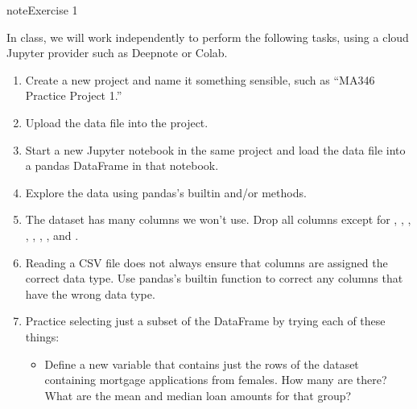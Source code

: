 \documentclass[letterpaper,10pt,english]{jupyterBook}
\begin{document}
\begin{sphinxadmonition}{note}{Exercise 1}

\sphinxAtStartPar
In class, we will work independently to perform the following tasks, using a cloud Jupyter provider such as Deepnote or Colab.
\begin{enumerate}
%
\item {} 
\sphinxAtStartPar
Create a new project and name it something sensible, such as “MA346 Practice Project 1.”

\item {} 
\sphinxAtStartPar
Upload the data file into the project.

\item {} 
\sphinxAtStartPar
Start a new Jupyter notebook in the same project and load the data file into a pandas DataFrame in that notebook.

\item {} 
\sphinxAtStartPar
Explore the data using pandas’s built\sphinxhyphen{}in  and/or  methods.

\item {} 
\sphinxAtStartPar
The dataset has many columns we won’t use.  Drop all columns except for , , , , , , , and .

\item {} 
\sphinxAtStartPar
Reading a CSV file does not always ensure that columns are assigned the correct data type.  Use pandas’s built\sphinxhyphen{}in  function to correct any columns that have the wrong data type.

\item {} 
\sphinxAtStartPar
Practice selecting just a subset of the DataFrame by trying each of these things:
\begin{itemize}
\item {} 
\sphinxAtStartPar
Define a new variable  that contains just the rows of the dataset containing mortgage applications from females.  How many are there?  What are the mean and median loan amounts for that group?


\end{itemize}
\end{enumerate}
\end{sphinxadmonition}
\end{document}
